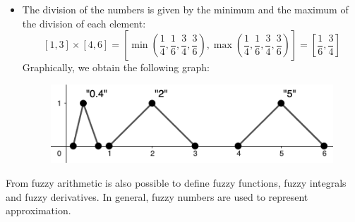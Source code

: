 \documentclass[12pt, a4paper]{report}
\newtheorem[L]{theorem}{Theorem}
\newtheorem[M]{corollary}{Corollary}
\newtheorem[M]{lemma}{Lemma}
\newtheorem[style=S,bodystyle=\normalfont]{definition}{Definition}
\begin{document}
\begin{example}
\begin{itemize}
            \item The division of the numbers is given by the minimum and the maximum of the division of each element:
            \[[1,3] \times [4,6]=[\min(\frac{1}{4}, \frac{1}{6}, \frac{3}{4}, \frac{3}{6}),\max(\frac{1}{4}, \frac{1}{6}, \frac{3}{4}, \frac{3}{6})]=[\frac{1}{6},\frac{3}{4}]\]
                Graphically, we obtain the following graph:
                \begin{figure}[H]
                    \centering
                    \includegraphics[width=0.5\linewidth]{images/division.png}
                \end{figure}
        \end{itemize}
    \end{example}
    
    From fuzzy arithmetic is also possible to define fuzzy functions, fuzzy integrals and fuzzy derivatives. In general, fuzzy numbers are used 
    to represent approximation.
\end{document}
